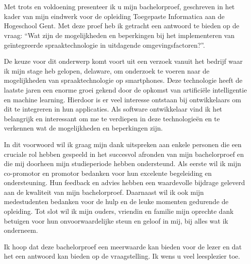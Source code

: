 
\chapter*{}%
\label{ch:voorwoord}


Met trots en voldoening presenteer ik u mijn bachelorproef, geschreven in het kader van mijn eindwerk voor de opleiding Toegepaste Informatica aan de Hogeschool Gent. Met deze proef heb ik getracht een antwoord te bieden op de vraag: ``Wat zijn de mogelijkheden en beperkingen bij het implementeren van geïntegreerde spraaktechnologie in uitdagende omgevingsfactoren?''.
\newline


De keuze voor dit onderwerp komt voort uit een verzoek vanuit het bedrijf waar ik mijn stage heb gelopen, delaware, om onderzoek te voeren naar de mogelijkheden van spraaktechnologie op smartphones. Deze technologie heeft de laatste jaren een enorme groei gekend door de opkomst van artificiële intelligentie en machine learning. Hierdoor is er veel interesse ontstaan bij ontwikkelaars om dit te integreren in hun applicaties. Als software ontwikkelaar vind ik het belangrijk en interessant om me te verdiepen in deze technologieën en te verkennen wat de mogelijkheden en beperkingen zijn.
\newline


In dit voorwoord wil ik graag mijn dank uitspreken aan enkele personen die een cruciale rol hebben gespeeld in het succesvol afronden van mijn bachelorproef en die mij doorheen mijn studieperiode hebben ondersteund. Als eerste wil ik mijn co-promotor en promotor bedanken voor hun excelente begeleiding en ondersteuning. Hun feedback en advies hebben een waardevolle bijdrage geleverd aan de kwaliteit van mijn bachelorproef. Daarnaast wil ik ook mijn medestudenten bedanken voor de hulp en de leuke momenten gedurende de opleiding. Tot slot wil ik mijn ouders, vriendin en familie mijn oprechte dank betuigen voor hun onvoorwaardelijke steun en geloof in mij, bij alles wat ik onderneem.
\newline

Ik hoop dat deze bachelorproef een meerwaarde kan bieden voor de lezer en dat het een antwoord kan bieden op de vraagstelling. Ik wens u veel leesplezier toe.

